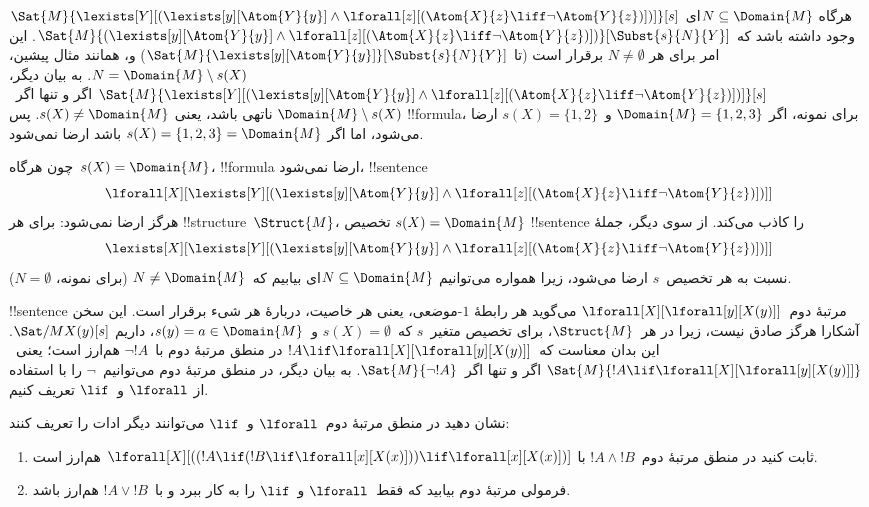 \documentclass[../../../include/open-logic-section]{subfiles}
\begin{document}
\begin{ex}
  $\Sat{M}{\lexists[Y][(\lexists[y][\Atom{Y}{y}] \land
  \lforall[z][(\Atom{X}{z} \liff \lnot \Atom{Y}{z})])]}[s]$ هرگاه
  $N \subseteq \Domain{M}$ای وجود داشته باشد که
  $\Sat{M}{(\lexists[y][\Atom{Y}{y}] \land \lforall[z][(\Atom{X}{z}
  \liff \lnot \Atom{Y}{z})])}[\Subst{s}{N}{Y}]$. این امر برای هر
  $N \neq \emptyset$ برقرار است (تا
  $\Sat{M}{\lexists[y][\Atom{Y}{y}]}[\Subst{s}{N}{Y}]$) و، همانند مثال
  پیشین، $N = \Domain{M} \setminus s(X)$. به بیان دیگر،
  $\Sat{M}{\lexists[Y][(\lexists[y][\Atom{Y}{y}] \land
  \lforall[z][(\Atom{X}{z} \liff \lnot \Atom{Y}{z})])]}[s]$ اگر و
  تنها اگر~$\Domain{M} \setminus s(X)$ ناتهی باشد، یعنی
  $s(X) \neq \Domain{M}$. پس !!{formula}، برای نمونه، اگر
  $\Domain{M} = \{1, 2, 3\}$ و~$s(X) = \{1, 2\}$ ارضا می‌شود، اما اگر
  $s(X) = \{1, 2, 3\} = \Domain{M}$ باشد ارضا نمی‌شود.

  چون هرگاه~$s(X) = \Domain{M}$، !!{formula} ارضا نمی‌شود،
  !!{sentence}
  \[
  \lforall[X][\lexists[Y][(\lexists[y][\Atom{Y}{y}] \land
      \lforall[z][(\Atom{X}{z} \liff \lnot \Atom{Y}{z})])]]
  \]
  هرگز ارضا نمی‌شود: برای هر !!{structure}~$\Struct{M}$، تخصیص
  $s(X) = \Domain{M}$ !!{sentence} را کاذب می‌کند. از سوی دیگر، جملهٔ
  \[
  \lexists[X][\lexists[Y][(\lexists[y][\Atom{Y}{y}] \land
      \lforall[z][(\Atom{X}{z} \liff \lnot \Atom{Y}{z})])]]
  \]
  نسبت به هر تخصیص~$s$ ارضا می‌شود، زیرا همواره می‌توانیم
  $N \subseteq \Domain{M}$ای بیابیم که~$N \neq \Domain{M}$ (برای
  نمونه، $N = \emptyset$).
\end{ex}

\begin{ex}
  !!{sentence} مرتبهٔ دوم~$\lforall[X][\lforall[y][X(y)]]$ می‌گوید هر
  رابطهٔ $1$-موضعی، یعنی هر خاصیت، دربارهٔ هر شیء برقرار است. این سخن
  آشکارا هرگز صادق نیست، زیرا در هر~$\Struct{M}$، برای تخصیص متغیر~$s$
  که~$s(X) = \emptyset$ و~$s(y) = a \in \Domain{M}$، داریم
  $\Sat/{M}{X(y)}[s]$. این بدان معناست که~$!A \lif
  \lforall[X][\lforall[y][X(y)]]$ در منطق مرتبهٔ دوم با~$\lnot !A$
  هم‌ارز است؛ یعنی~$\Sat{M}{!A \lif
  \lforall[X][\lforall[y][X(y)]]}$ اگر و تنها اگر~$\Sat{M}{\lnot !A}$.
  به بیان دیگر، در منطق مرتبهٔ دوم می‌توانیم~$\lnot$ را با استفاده از
  $\lforall$ و~$\lif$ تعریف کنیم.
\end{ex}

\begin{prob}
  نشان دهید در منطق مرتبهٔ دوم~$\lforall$ و~$\lif$ می‌توانند دیگر
  ادات را تعریف کنند:
  \begin{enumerate}
    \item ثابت کنید در منطق مرتبهٔ دوم~$!A \land !B$ با
    $\lforall[X][((!A \lif (!B \lif \lforall[x][X(x)])) \lif
    \lforall[x][X(x)])]$ هم‌ارز است.
    \item فرمولی مرتبهٔ دوم بیابید که فقط~$\lforall$ و~$\lif$ را به کار
    ببرد و با~$!A \lor !B$ هم‌ارز باشد.
  \end{enumerate}
\end{prob}
\end{document}
